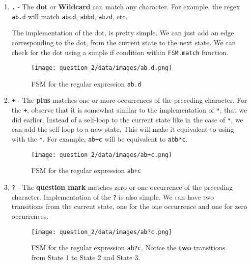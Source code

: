 \documentclass[12pt]{report}
\begin{document}
\begin{enumerate}
    \item \texttt{.} - The \textbf{dot} or \textbf{Wildcard} can match any character. For example, the regex \texttt{ab.d} will match \texttt{abcd}, \texttt{abbd}, \texttt{abzd}, etc.

          The implementation of the dot, is pretty simple. We can just add an edge corresponding to the dot, from the current state to the next state. We can check for the dot using a simple if condition within \texttt{FSM.match} function.

          \begin{figure}[H]
              \centering
              \texttt{[image: question\_2/data/images/ab.d.png]}
              \caption{FSM for the regular expression \texttt{ab.d}}
          \end{figure}

    \item \texttt{+} - The \textbf{plus} matches one or more occurrences of the preceding character.
          For the \texttt{+}, observe that it is somewhat similar to the implementation of \texttt{*}, that we did earlier. Instead of a self-loop to the current state like in the case of \texttt{*}, we can add the self-loop to a new state. This will make it equivalent to using with the \texttt{*}. For example, \texttt{ab+c} will be equivalent to \texttt{abb*c}.

          \begin{figure}[H]
              \centering
              \texttt{[image: question\_2/data/images/ab+c.png]}
              \caption{FSM for the regular expression \texttt{ab+c}}
          \end{figure}

    \item \texttt{?} - The \textbf{question mark} matches zero or one occurrence of the preceding character.
          Implementation of the \texttt{?} is also simple. We can have two transitions from the current state, one for the one occurrence and one for zero occurrences.

          \begin{figure}[H]
              \centering
              \texttt{[image: question\_2/data/images/ab?c.png]}
              \caption{FSM for the regular expression \texttt{ab?c}. Notice the \textbf{two} transitions from State 1 to State 2 and State 3.}
          \end{figure}


\end{enumerate}
\end{document}
